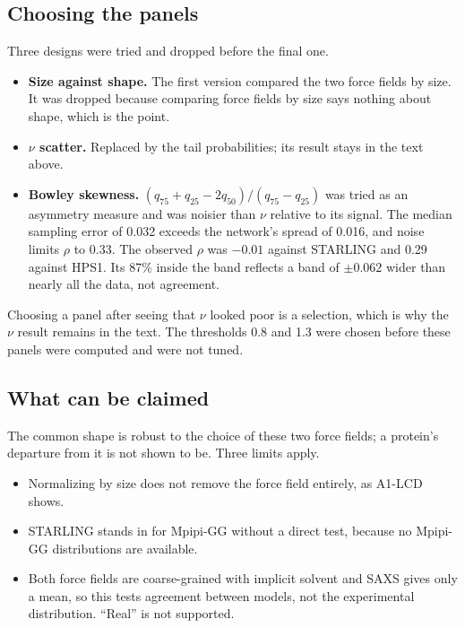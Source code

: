 \documentclass[11pt]{article}
\begin{document}
\subsection{Choosing the panels}
Three designs were tried and dropped before the final one.
\begin{itemize}
\item \textbf{Size against shape.} The first version compared the two force fields by size. It was dropped because comparing force fields by size says nothing about shape, which is the point.
\item \textbf{$\nu$ scatter.} Replaced by the tail probabilities; its result stays in the text above.
\item \textbf{Bowley skewness.} $(q_{75}+q_{25}-2q_{50})/(q_{75}-q_{25})$ was tried as an asymmetry measure and was noisier than $\nu$ relative to its signal. The median sampling error of 0.032 exceeds the network's spread of 0.016, and noise limits $\rho$ to 0.33. The observed $\rho$ was $-0.01$ against STARLING and 0.29 against HPS1. Its 87\% inside the band reflects a band of $\pm0.062$ wider than nearly all the data, not agreement.
\end{itemize}
Choosing a panel after seeing that $\nu$ looked poor is a selection, which is why the $\nu$ result remains in the text. The thresholds 0.8 and 1.3 were chosen before these panels were computed and were not tuned.

\subsection{What can be claimed}
The common shape is robust to the choice of these two force fields; a protein's departure from it is not shown to be. Three limits apply.
\begin{itemize}
\item Normalizing by size does not remove the force field entirely, as A1-LCD shows.
\item STARLING stands in for Mpipi-GG without a direct test, because no Mpipi-GG distributions are available.
\item Both force fields are coarse-grained with implicit solvent and SAXS gives only a mean, so this tests agreement between models, not the experimental distribution. ``Real'' is not supported.
\end{itemize}

\end{document}
